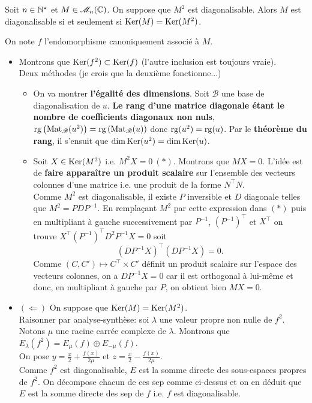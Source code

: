 \begin{tcolorbox}
    Soit $n \in \mathbb{N}^\star$ et $M \in \mathscr{M}_n(\mathbb{C})$. On suppose que $M^2$ est diagonalisable. Alors $M$ est diagonalisable si et seulement si $\mathrm{Ker}(M) = \mathrm{Ker}(M^2)$.
\end{tcolorbox}

On note $f$ l'endomorphisme canoniquement associé à $M$. 
\begin{itemize}
    \item 
    Montrons que $\mathrm{Ker}(f^2) \subset \mathrm{Ker}(f)$ (l'autre inclusion est toujours vraie). \\
    Deux méthodes (je crois que la deuxième fonctionne...)
    \begin{itemize}
        \item On va montrer \textbf{l'égalité des dimensions}. Soit $\mathscr{B}$ une base de diagonalisation de $u$. \textbf{Le rang d'une matrice diagonale étant le nombre de coefficients diagonaux non nuls}, $\mathrm{rg} \left(\mathrm{Mat}_\mathscr{B}(u^2) \right) = \mathrm{rg} \left(\mathrm{Mat}_\mathscr{B}(u) \right)$ donc $\mathrm{rg}(u^2) = \mathrm{rg}(u)$. Par le \textbf{théorème du rang}, il s'ensuit que $\dim \mathrm{Ker}(u^2) = \dim \mathrm{Ker}(u)$.
        \item Soit $X \in \mathrm{Ker}(M^2)$ i.e. $M^2 X = 0\ (*)$. Montrons que $MX = 0$. L'idée est de \textbf{faire apparaître un produit scalaire} sur l'ensemble des vecteurs colonnes d'une matrice i.e. une produit de la forme $N^\top N$. \\
        Comme $M^2$ est diagonalisable, il existe $P$ inversible et $D$ diagonale telles que $M^2 = PDP^{-1}$. En remplaçant $M^2$ par cette expression dans $(*)$ puis en multipliant à gauche successivement par $P^{-1}$,  $(P^{-1})^\top$ et $X^\top$ on trouve $X^\top (P^{-1})^\top D^2 P^{-1} X = 0$ soit 
        $$(D P^{-1} X)^\top (D P^{-1} X) = 0.$$
        Comme $(C, C') \mapsto C^\top \times C'$ définit un produit scalaire sur l'espace des vecteurs colonnes, on a $D P^{-1} X = 0$ car il est orthogonal à lui-même et donc, en multipliant à gauche par $P$, on obtient bien $MX = 0$. 
    \end{itemize}
    \item $(\Leftarrow)$ On suppose que $\mathrm{Ker}(M) = \mathrm{Ker}(M^2)$. \\
    Raisonner par analyse-synthèse: soi $\lambda$ une valeur propre non nulle de $f^2$. Notons $\mu$ une racine carrée complexe de $\lambda$. Montrons que $E_{\lambda}(f^2) = E_{\mu}(f) \oplus E_{-\mu}(f)$. \\
    On pose $y = \frac{x}{2} + \frac{f(x)}{2 \mu}$ et $z = \frac{x}{2} - \frac{f(x)}{2 \mu}$. \\
    Comme $f^2$ est diagonalisable, $E$ est la somme directe des sous-espaces propres de $f^2$. On décompose chacun de ces sep comme ci-dessus et on en déduit que $E$ est la somme directe des sep de $f$ i.e. $f$ est diagonalisable. 
\end{itemize}